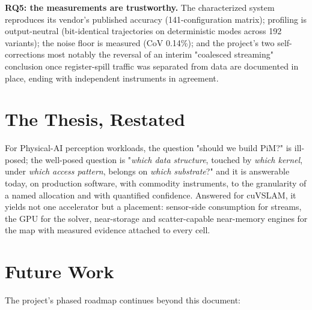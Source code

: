 \textbf{RQ5: the measurements are trustworthy.} The characterized system reproduces its vendor's published accuracy (141-configuration matrix); profiling is output-neutral (bit-identical trajectories on deterministic modes across 192 variants); the noise floor is measured (CoV 0.14\%); and the project's two self-corrections most notably the reversal of an interim "coalesced streaming" conclusion once register-spill traffic was separated from data are documented in place, ending with independent instruments in agreement.

\section{The Thesis, Restated}

For Physical-AI perception workloads, the question "should we build PiM?" is ill-posed; the well-posed question is "\emph{which data structure}, touched by \emph{which kernel}, under \emph{which access pattern}, belongs on \emph{which substrate}?" and it is answerable today, on production software, with commodity instruments, to the granularity of a named allocation and with quantified confidence. Answered for cuVSLAM, it yields not one accelerator but a placement: sensor-side consumption for streams, the GPU for the solver, near-storage and scatter-capable near-memory engines for the map with measured evidence attached to every cell.

\section{Future Work}
\label{sec:roadmap}

The project's phased roadmap continues beyond this document:

